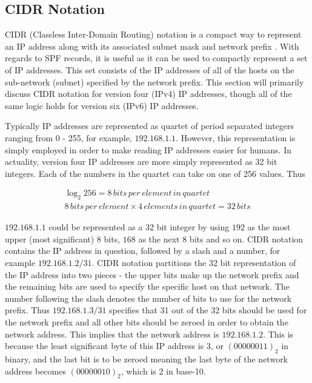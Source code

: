 \subsection{CIDR Notation} \label{sec:CIDR}
CIDR (Classless Inter-Domain Routing) notation is a compact way to represent an IP address along with its associated subnet mask and network prefix \cite{cidr}. With regards to SPF records, it is useful as it can be used to compactly represent a set of IP addresses. This set consists of the IP addresses of all of the hosts on the sub-network (subnet) specified by the network prefix. This section will primarily discuss CIDR notation for version four (IPv4) IP addresses, though all of the same logic holds for version six (IPv6) IP addresses. 

Typically IP addresses are represented as quartet of period separated integers ranging from 0 - 255, for example, $192.168.1.1$. However, this representation is simply employed in order to make reading IP addresses easier for humans. In actuality, version four IP addresses are more simply represented as 32 bit integers. Each of the numbers in the quartet can take on one of 256 values. Thus

\begin{equation}
\begin{split}
\log_2 256 = 8\,bits\,per\,element\,in\,quartet \\
8\,bits\,per\,element \times 4\,elements\,in\,quartet = 32\, bits
\end{split}
\end{equation}



$192.168.1.1$ could be represented as a 32 bit integer by using $192$ as the most upper (most significant) 8 bits, $168$ as the next 8 bits and so on. CIDR notation contains the IP address in question, followed by a slash and a number, for example $192.168.1.2/31$. CIDR notation partitions the 32 bit representation of the IP address into two pieces - the upper bits make up the network prefix and the remaining bits are used to specify the specific host on that network. The number following the slash denotes the number of bits to use for the network prefix. Thus $192.168.1.3/31$ specifies that 31 out of the 32 bits should be used for the network prefix and all other bits should be zeroed in order to obtain the network address. This implies that the network address is $192.168.1.2$. This is because the least significant byte of this IP address is 3, or $(0000 0011)_2$ in binary, and the last bit is to be zeroed meaning the last byte of the network address becomes $(0000 0010)_2$, which is 2 in base-10. 

